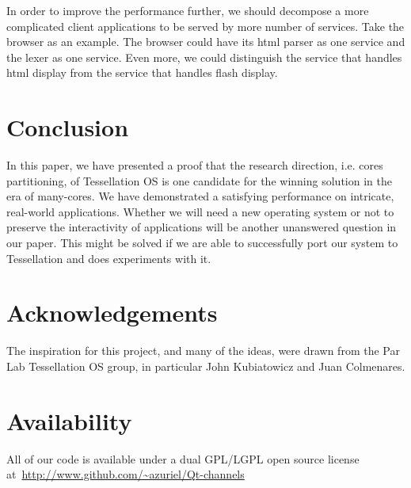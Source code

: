 \documentclass[letterpaper,twocolumn,11pt]{article}
\begin{document}
In order to improve the performance further, we should decompose a more complicated client applications to be served by more number of services. Take the browser as an example. The browser could have its html parser as one service and the lexer as one service. Even more, we could distinguish the service that handles html display from the service that handles flash display.

\section{Conclusion}

In this paper, we have presented a proof that the research direction, i.e. cores partitioning, of Tessellation OS is one candidate for the winning solution in the era of many-cores. We have demonstrated a satisfying performance on intricate, real-world applications. Whether we will need a new operating system or not to preserve the interactivity of applications will be another unanswered question in our paper. This might be solved if we are able to successfully port our system to Tessellation and does experiments with it.

\section{Acknowledgements}

The inspiration for this project, and many of the ideas, were drawn from the Par Lab Tessellation OS group, in particular John Kubiatowicz and Juan Colmenares. 

\section{Availability}

All of our code is available under a dual GPL/LGPL open source license at~\url{http://www.github.com/~azuriel/Qt-channels}

\footnotesize{
}

\end{document}
